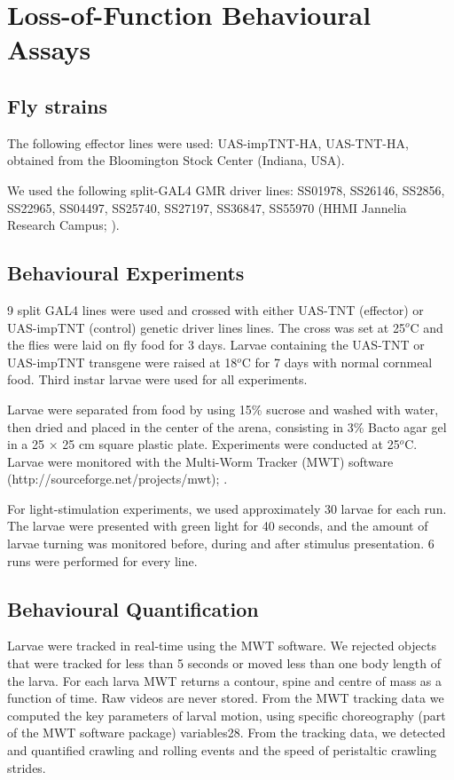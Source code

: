 
\section{Loss-of-Function Behavioural Assays}

    \subsection{Fly strains}
    The following effector lines were used: UAS-impTNT-HA, UAS-TNT-HA, obtained from the Bloomington Stock Center (Indiana, USA).

    We used the following split-GAL4 GMR driver lines: SS01978, SS26146, SS2856, SS22965, SS04497, SS25740, SS27197, SS36847, SS55970 (HHMI Jannelia Research Campus; \citep{li2014gal4, meissner2025splitgal4}). 
    

\subsection{Behavioural Experiments}

    9 split GAL4 lines were used and crossed with either UAS-TNT (effector) or UAS-impTNT (control) genetic driver lines lines.
    The cross was set at 25$^o$C and the flies were laid on fly food for 3 days.
    Larvae containing the UAS-TNT or UAS-impTNT transgene were raised at 18$^o$C for 7 days with normal cornmeal food.
    Third instar larvae were used for all experiments.

    Larvae were separated from food by using 15\% sucrose and washed with water, then dried and placed in the center of the arena, consisting in 3\% Bacto agar gel in a 25 × 25 cm square plastic plate.
    Experiments were conducted at 25$^o$C.
    Larvae were monitored with the Multi-Worm Tracker (MWT) software (http://sourceforge.net/projects/mwt); \citep{Ohyama2013PlosONE}.

    For light-stimulation experiments, we used approximately 30 larvae for each run. The larvae were presented with green light for 40 seconds, and the amount of larvae turning was monitored before, during and after stimulus presentation. 6 runs were performed for every line.


\subsection{Behavioural Quantification}
Larvae were tracked in real-time using the MWT software. We rejected objects that were tracked for less than 5 seconds or moved less than one body length of the larva. For each larva MWT returns a contour, spine and centre of mass as a function of time. Raw videos are never stored. From the MWT tracking data we computed the key parameters of larval motion, using specific choreography (part of the MWT software package) variables28. From the tracking data, we detected and quantified crawling and rolling events and the speed of peristaltic crawling strides.%

